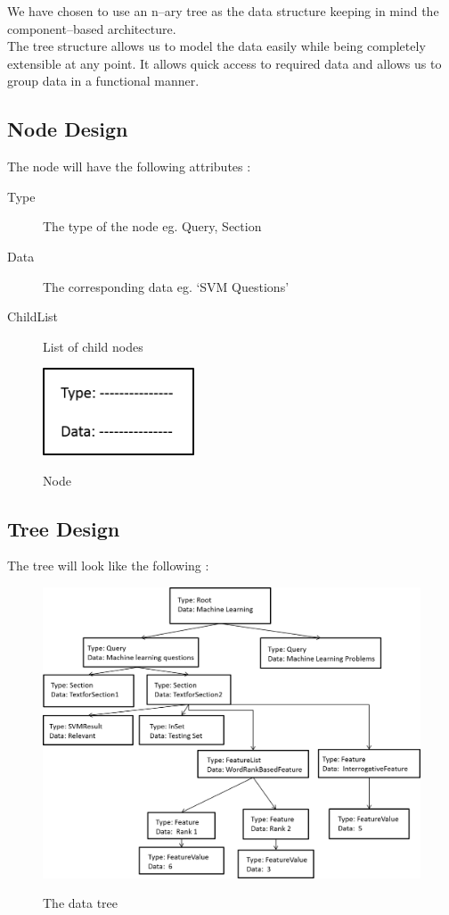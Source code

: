 \documentclass[10pt,a4paper]{report}
\begin{document}
We have chosen to use an n--ary tree as the data structure keeping in mind the component--based architecture. \\

The tree structure allows us to model the data easily while being completely extensible at any point. 
It allows quick access to required data and allows us to group data in a functional manner. 

\subsection{Node Design}

The node will have the following attributes : 
\begin{description}
	\item[Type] The type of the node eg. Query, Section
	\item[Data] The corresponding data eg. `SVM Questions'
	\item[ChildList] List of child nodes
\end{description}

\begin{figure}[h!]
\centering
\includegraphics[width=0.40\textwidth]{./diagrams/node}\\
\caption{Node}
\end{figure}

\clearpage 

\subsection{Tree Design}

The tree will look like the following : \\

\begin{figure}[h!]
\centering
\includegraphics[width=\textwidth]{./diagrams/tree}\\
\caption{The data tree}
\end{figure}
\end{document}
